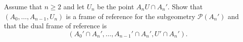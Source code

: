 Assume that $n \geq 2$ and let $U_n$ be the point $A_nU \cap A_n'$. Show that $(A_0, \ldots, A_{n-1}, U_n)$ is a frame of reference for the subgeometry $\mathcal{P}(A_n')$ and that the dual frame of reference is
$$(A_0' \cap A_n', \ldots, A_{n-1}' \cap A_n', U' \cap A_n').$$
